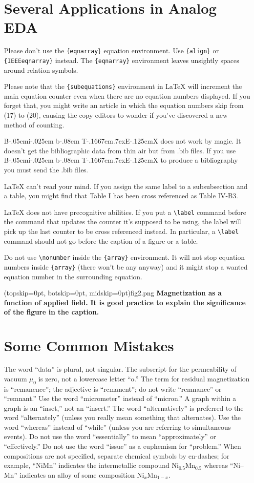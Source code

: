 \documentclass{ieeeaccess}
\def\BibTeX{{\rm B\kern-.05em{\sc i\kern-.025em b}\kern-.08em
    T\kern-.1667em\lower.7ex\hbox{E}\kern-.125emX}}
\begin{document}
\section{Several Applications in Analog EDA}

Please don't use the \verb|{eqnarray}| equation environment. Use \verb|{align}|
or \verb|{IEEEeqnarray}| instead. The \verb|{eqnarray}| environment leaves
unsightly spaces around relation symbols.

Please note that the \verb|{subequations}| environment in {\LaTeX} will
increment the main equation counter even when there are no equation numbers
displayed. If you forget that, you might write an article in which the equation
numbers skip from (17) to (20), causing the copy editors to wonder if you've
discovered a new method of counting.

	{\BibTeX} does not work by magic. It doesn't get the bibliographic
data from thin air but from .bib files. If you use {\BibTeX} to produce a
bibliography you must send the .bib files.

	{\LaTeX} can't read your mind. If you assign the same label to a
subsubsection and a table, you might find that Table I has been cross
referenced as Table IV-B3.

{\LaTeX} does not have precognitive abilities. If you put a
\verb|\label| command before the command that updates the counter it's
supposed to be using, the label will pick up the last counter to be
cross referenced instead. In particular, a \verb|\label| command
should not go before the caption of a figure or a table.

Do not use \verb|\nonumber| inside the \verb|{array}| environment. It will not
stop equation numbers inside \verb|{array}| (there won't be any anyway) and it
might stop a wanted equation number in the surrounding equation.

\Figure[t!](topskip=0pt, botskip=0pt, midskip=0pt){fig2.png}
{ \textbf{Magnetization as a function of applied field.
		It is good practice to explain the significance of the figure in the caption.}\label{fig2}}

\section{Some Common Mistakes}
The word ``data'' is plural, not singular. The subscript for the permeability
of vacuum $\mu _{0}$ is zero, not a lowercase letter ``o.'' The term for
residual magnetization is ``remanence''; the adjective is ``remanent''; do not
write ``remnance'' or ``remnant.'' Use the word ``micrometer'' instead of
``micron.'' A graph within a graph is an ``inset,'' not an ``insert.'' The word
``alternatively'' is preferred to the word ``alternately'' (unless you really
mean something that alternates). Use the word ``whereas'' instead of ``while''
(unless you are referring to simultaneous events). Do not use the word
``essentially'' to mean ``approximately'' or ``effectively.'' Do not use the
word ``issue'' as a euphemism for ``problem.'' When compositions are not
specified, separate chemical symbols by en-dashes; for example, ``NiMn''
indicates the intermetallic compound Ni$_{0.5}$Mn$_{0.5}$ whereas ``Ni--Mn''
indicates an alloy of some composition Ni$_{x}$Mn$_{1-x}$.
\end{document}

